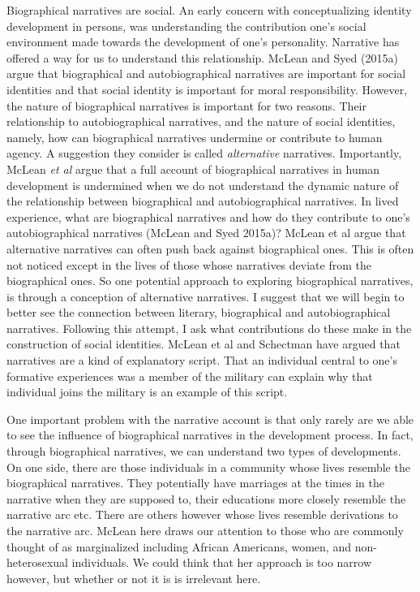 \documentclass[
  letterpaper,
  DIV=11,
  numbers=noendperiod]{scrartcl}
\theoremstyle{remark}
\begin{document}
Biographical narratives are social. An early concern with
conceptualizing identity development in persons, was understanding the
contribution one's social environment made towards the development of
one's personality. Narrative has offered a way for us to understand this
relationship. McLean and Syed (2015a) argue that biographical and
autobiographical narratives are important for social identities and that
social identity is important for moral responsibility. However, the
nature of biographical narratives is important for two reasons. Their
relationship to autobiographical narratives, and the nature of social
identities, namely, how can biographical narratives undermine or
contribute to human agency. A suggestion they consider is called
\emph{alternative} narratives. Importantly, McLean \emph{et al} argue
that a full account of biographical narratives in human development is
undermined when we do not understand the dynamic nature of the
relationship between biographical and autobiographical narratives. In
lived experience, what are biographical narratives and how do they
contribute to one's autobiographical narratives (McLean and Syed 2015a)?
McLean et al argue that alternative narratives can often push back
against biographical ones. This is often not noticed except in the lives
of those whose narratives deviate from the biographical ones. So one
potential approach to exploring biographical narratives, is through a
conception of alternative narratives. I suggest that we will begin to
better see the connection between literary, biographical and
autobiographical narratives. Following this attempt, I ask what
contributions do these make in the construction of social identities.
McLean et al and Schectman have argued that narratives are a kind of
explanatory script. That an individual central to one's formative
experiences was a member of the military can explain why that individual
joins the military is an example of this script.

One important problem with the narrative account is that only rarely are
we able to see the influence of biographical narratives in the
development process. In fact, through biographical narratives, we can
understand two types of developments. On one side, there are those
individuals in a community whose lives resemble the biographical
narratives. They potentially have marriages at the times in the
narrative when they are supposed to, their educations more closely
resemble the narrative arc etc. There are others however whose lives
resemble derivations to the narrative arc. McLean here draws our
attention to those who are commonly thought of as marginalized including
African Americans, women, and non-heterosexual individuals. We could
think that her approach is too narrow however, but whether or not it is
is irrelevant here.
\end{document}
